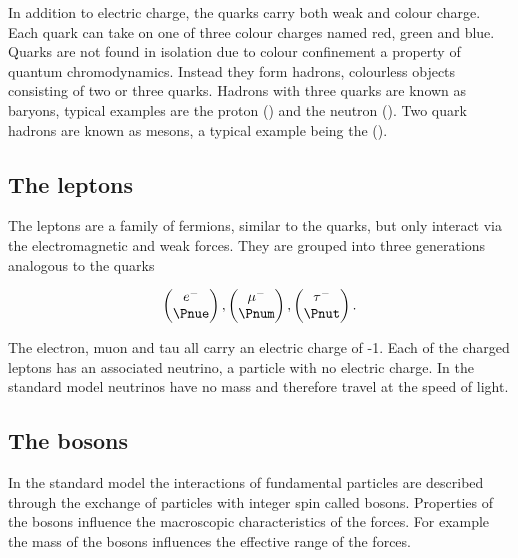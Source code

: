 In addition to electric charge, the quarks carry both weak and colour charge. Each quark can take on one of three colour charges named red, green and blue. Quarks are not found in isolation due to colour confinement a property of quantum chromodynamics. Instead they form hadrons, colourless objects consisting of two or three quarks. Hadrons with three quarks are known as baryons, typical examples are the proton (\Pup\Pup\Pdown) and the neutron (\Pup\Pdown\Pdown). Two quark hadrons are known as mesons, a typical example being the  \Ppiplus (\Pup\APdown).

\subsection{The leptons}
\label{section:particle-physics:SM:leptons}

The leptons are a family of fermions, similar to the quarks, but only interact via the electromagnetic and weak forces. They are grouped into three generations analogous to the quarks


\begin{equation}
  \begin{pmatrix}
    e^{-} \\
    \Pnue
  \end{pmatrix}
  ,
  \begin{pmatrix}
    \mu^{-} \\
    \Pnum
  \end{pmatrix}
  ,
  \begin{pmatrix}
    \tau^{-} \\
    \Pnut
  \end{pmatrix}
.
\end{equation}

\noindent
The electron, muon and tau all carry an electric charge of -1. Each of the charged leptons has an associated neutrino, a particle with no electric charge. In the standard model neutrinos have no mass and therefore travel at the speed of light.


\subsection{The bosons}
\label{section:particle-physics:SM:bosons}

In the standard model the interactions of fundamental particles are described through the exchange of particles with integer spin called bosons. Properties of the bosons influence the macroscopic characteristics of the forces. For example the mass of the bosons influences the effective range of the forces.

